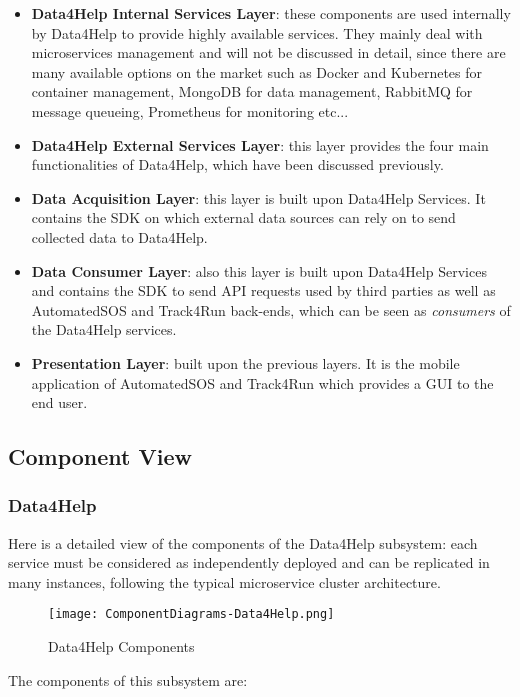 \begin{itemize}
	\item \textbf{Data4Help Internal Services Layer}: these components are used internally by Data4Help to provide highly available services. They mainly deal with microservices management and will not be discussed in detail, since there are many available options on the market such as Docker and Kubernetes for container management, MongoDB for data management, RabbitMQ for message queueing, Prometheus for monitoring etc...
	\item \textbf{Data4Help External Services Layer}: this layer provides the four main functionalities of Data4Help, which have been discussed previously.
	\item \textbf{Data Acquisition Layer}: this layer is built upon Data4Help Services. It contains the SDK on which external data sources can rely on to send collected data to Data4Help.
	\item \textbf{Data Consumer Layer}: also this layer is built upon Data4Help Services and contains the SDK to send API requests used by third parties as well as AutomatedSOS and Track4Run back-ends, which can be seen as \textit{consumers} of the Data4Help services.
	\item \textbf{Presentation Layer}: built upon the previous layers. It is the mobile application of AutomatedSOS and Track4Run which provides a GUI to the end user.
\end{itemize}


\subsection{Component View}

\subsubsection{Data4Help}
Here is a detailed view of the components of the Data4Help subsystem: each service must be considered as independently deployed and can be replicated in many instances, following the typical microservice cluster architecture. 

\FloatBarrier
\begin{figure}[!h]
	\centering
	\texttt{[image: ComponentDiagrams-Data4Help.png]}
	\caption{Data4Help Components}
\end{figure}
\FloatBarrier

The components of this subsystem are:

